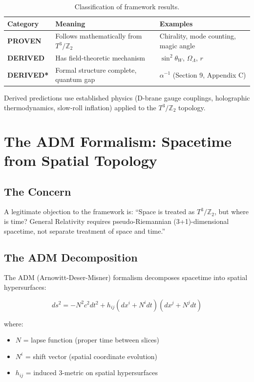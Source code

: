 \documentclass[12pt,a4paper]{article}
\newcommand{\Ztwo}{\mathbb{Z}_2}
\newcommand{\Tthree}{T^3}
\newcommand{\OmegaL}{\Omega_\Lambda}
\newcommand{\sinW}{\sin^2\theta_W}
\begin{document}
\begin{table}[H]
\centering
\begin{tabular}{lll}
\toprule
\textbf{Category} & \textbf{Meaning} & \textbf{Examples} \\
\midrule
\textbf{PROVEN} & Follows mathematically from $\Tthree/\Ztwo$ & Chirality, mode counting, magic angle \\
\textbf{DERIVED} & Has field-theoretic mechanism & $\sinW$, $\OmegaL$, $r$ \\
\textbf{DERIVED*} & Formal structure complete, quantum gap & $\alpha^{-1}$ (Section 9, Appendix C) \\
\bottomrule
\end{tabular}
\caption{Classification of framework results.}
\end{table}

Derived predictions use established physics (D-brane gauge couplings, holographic thermodynamics, slow-roll inflation) applied to the $\Tthree/\Ztwo$ topology.

\section{The ADM Formalism: Spacetime from Spatial Topology}
\label{sec:adm}

\subsection{The Concern}

A legitimate objection to the framework is: ``Space is treated as $\Tthree/\Ztwo$, but where is time? General Relativity requires pseudo-Riemannian (3+1)-dimensional spacetime, not separate treatment of space and time.''

\subsection{The ADM Decomposition}

The ADM (Arnowitt-Deser-Misner) formalism decomposes spacetime into spatial hypersurfaces:

\begin{equation}
ds^2 = -N^2 c^2 dt^2 + h_{ij}(dx^i + N^i dt)(dx^j + N^j dt)
\end{equation}

where:
\begin{itemize}
    \item $N$ = lapse function (proper time between slices)
    \item $N^i$ = shift vector (spatial coordinate evolution)
    \item $h_{ij}$ = induced 3-metric on spatial hypersurfaces
\end{itemize}
\end{document}
